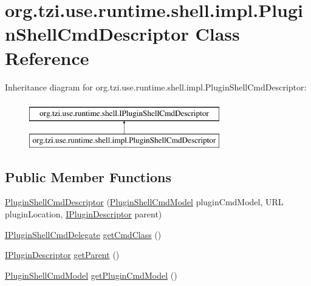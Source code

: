 \hypertarget{classorg_1_1tzi_1_1use_1_1runtime_1_1shell_1_1impl_1_1_plugin_shell_cmd_descriptor}{\section{org.\-tzi.\-use.\-runtime.\-shell.\-impl.\-Plugin\-Shell\-Cmd\-Descriptor Class Reference}
\label{classorg_1_1tzi_1_1use_1_1runtime_1_1shell_1_1impl_1_1_plugin_shell_cmd_descriptor}
}
Inheritance diagram for org.\-tzi.\-use.\-runtime.\-shell.\-impl.\-Plugin\-Shell\-Cmd\-Descriptor\-:\begin{figure}[H]
\begin{center}
\leavevmode
\includegraphics[height=2.000000cm]{classorg_1_1tzi_1_1use_1_1runtime_1_1shell_1_1impl_1_1_plugin_shell_cmd_descriptor}
\end{center}
\end{figure}
\subsection*{Public Member Functions}
\begin{DoxyCompactItemize}
\item 
\hyperlink{classorg_1_1tzi_1_1use_1_1runtime_1_1shell_1_1impl_1_1_plugin_shell_cmd_descriptor_accf8f4e150b8726a5f7cf1089144c658}{Plugin\-Shell\-Cmd\-Descriptor} (\hyperlink{classorg_1_1tzi_1_1use_1_1runtime_1_1model_1_1_plugin_shell_cmd_model}{Plugin\-Shell\-Cmd\-Model} plugin\-Cmd\-Model, U\-R\-L plugin\-Location, \hyperlink{interfaceorg_1_1tzi_1_1use_1_1runtime_1_1_i_plugin_descriptor}{I\-Plugin\-Descriptor} parent)
\item 
\hyperlink{interfaceorg_1_1tzi_1_1use_1_1runtime_1_1shell_1_1_i_plugin_shell_cmd_delegate}{I\-Plugin\-Shell\-Cmd\-Delegate} \hyperlink{classorg_1_1tzi_1_1use_1_1runtime_1_1shell_1_1impl_1_1_plugin_shell_cmd_descriptor_ab84155e21c69216d6e0d2d6c270e325c}{get\-Cmd\-Class} ()
\item 
\hyperlink{interfaceorg_1_1tzi_1_1use_1_1runtime_1_1_i_plugin_descriptor}{I\-Plugin\-Descriptor} \hyperlink{classorg_1_1tzi_1_1use_1_1runtime_1_1shell_1_1impl_1_1_plugin_shell_cmd_descriptor_a86437c1302994f55e2ff165122b5c642}{get\-Parent} ()
\item 
\hyperlink{classorg_1_1tzi_1_1use_1_1runtime_1_1model_1_1_plugin_shell_cmd_model}{Plugin\-Shell\-Cmd\-Model} \hyperlink{classorg_1_1tzi_1_1use_1_1runtime_1_1shell_1_1impl_1_1_plugin_shell_cmd_descriptor_a303ee83f9e9ab447f20d9f19616d6575}{get\-Plugin\-Cmd\-Model} ()
\end{DoxyCompactItemize}



